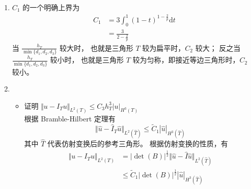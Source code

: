 \documentclass[a4paper]{article}
\begin{document}
\begin{enumerate}
\begin{itemize}
\begin{equation}
\begin{aligned}
                                (1-t) \text{d}t \right)\\
                                &\leq \frac{3h_T}{\min\{d_1,d_2,d_3\}}h_T \left( \int_{0}^{1
                                } (1-t)^{1-\frac{2}{p}} \text{d}t \right) |u|_{W^{2,p}(T)}\\
                                &= C_2 h_T |u|_{W^{2,p}(T)}
                            \end{aligned}
                        \end{equation}
                \end{itemize}
    \item[(b)]  $C_1$ 的一个明确上界为
                \begin{equation}
                    \begin{aligned}
                        C_1 &= 3\int_{0}^{1
                        } (1-t)^{1-\frac{2}{p}} \text{d}t\\
                        &=\frac{3}{2-\frac{2}{p}}
                    \end{aligned}
                \end{equation}
                当 $\frac{h_T}{\min\{d_1,d_2,d_3\}}$ 较大时，
                也就是三角形 $T$ 较为扁平时，$C_2$ 较大；
                反之当 $\frac{h_T}{\min\{d_1,d_2,d_3\}}$ 较小时，
                也就是三角形 $T$ 较为匀称，即接近等边三角形时，$C_2$ 较小。
    \item[(c)]  
                \begin{itemize}
                    \item 证明 $\Vert u-I_T u\Vert_{L^2(T)} \leq C_3 h^3_T |u|_{H^3(T)}$\\
                        根据 Bramble-Hilbert 定理有
                        \begin{equation}
                            \Vert \hat{u}-\hat{I}_T\hat{u}\Vert_{L^2(\hat{T})} 
                            \leq \tilde{C}_1 |\hat{u}|_{H^3(\hat{T})}  
                        \end{equation}
                        其中 $\hat{T}$ 代表仿射变换后的参考三角形。
                        根据仿射变换的性质，有
                        \begin{equation}
                            \begin{aligned}
                                \Vert u-I_Tu\Vert_{L^2(T)} 
                                &=|\det(B)|^{\frac{1}{2}} \Vert \hat{u}-\hat{I}\hat{u}\Vert_{L^2(\hat{T})} \\
                                &\leq \tilde{C}_1 |\det(B)|^{\frac{1}{2}} |\hat{u}|_{H^3(\hat{T})}\\

\end{aligned}
\end{equation}
\end{itemize}
\end{enumerate}
\end{document}
